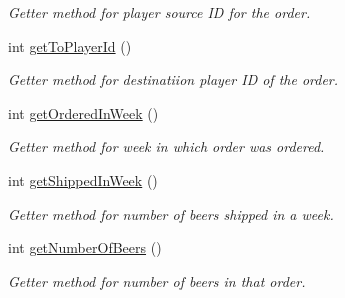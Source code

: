 \begin{DoxyCompactItemize}
\begin{DoxyCompactList}\small\item\em Getter method for player source ID for the order. \end{DoxyCompactList}\item 
int \hyperlink{class_order_a212e8294656ab9582dbca89de2e1e4c9}{get\+To\+Player\+Id} ()
\begin{DoxyCompactList}\small\item\em Getter method for destinatiion player ID of the order. \end{DoxyCompactList}\item 
int \hyperlink{class_order_aed0ea4435169c95ecc05530df91f225a}{get\+Ordered\+In\+Week} ()
\begin{DoxyCompactList}\small\item\em Getter method for week in which order was ordered. \end{DoxyCompactList}\item 
int \hyperlink{class_order_a7103f60141cf2fefd053aac011dc7613}{get\+Shipped\+In\+Week} ()
\begin{DoxyCompactList}\small\item\em Getter method for number of beers shipped in a week. \end{DoxyCompactList}\item 
int \hyperlink{class_order_a88e86300e6c1b4a21e4ea042b60a7220}{get\+Number\+Of\+Beers} ()
\begin{DoxyCompactList}\small\item\em Getter method for number of beers in that order. \end{DoxyCompactList}\end{DoxyCompactItemize}
